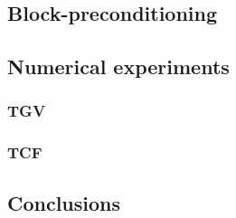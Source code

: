 \documentclass[compress,11 pt,t]{beamer}
\begin{document}
\subsection{Block-preconditioning}

\subsection{Numerical experiments}

\subsubsection{TGV}

\subsubsection{TCF}

\subsection{Conclusions}

\end{document}
